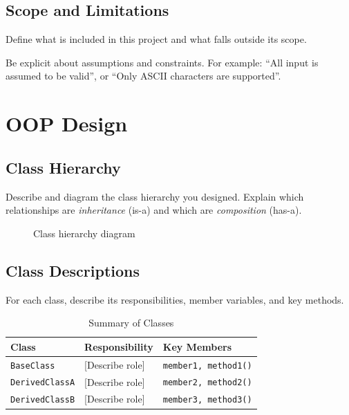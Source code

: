 \documentclass[11pt]{article}
\begin{document}
\subsection{Scope and Limitations}
Define what is included in this project and what falls outside its scope.

\begin{notebox}
Be explicit about assumptions and constraints. For example: ``All input is assumed to be valid'', or ``Only ASCII characters are supported''.
\end{notebox}

\section{OOP Design}

\subsection{Class Hierarchy}
Describe and diagram the class hierarchy you designed. Explain which relationships are \emph{inheritance} (is-a) and which are \emph{composition} (has-a).

\begin{figure}[H]
    \centering
    \caption{Class hierarchy diagram}
    \label{fig:hierarchy}
\end{figure}

\subsection{Class Descriptions}
For each class, describe its responsibilities, member variables, and key methods.

\begin{table}[H]
    \centering
    \caption{Summary of Classes}
    \label{tab:classes}
    \begin{tabular}{|l|p{4cm}|p{5cm}|}
        \hline
        \textbf{Class} & \textbf{Responsibility} & \textbf{Key Members} \\
        \hline
        \texttt{BaseClass}    & [Describe role] & \texttt{member1, method1()} \\
        \hline
        \texttt{DerivedClassA} & [Describe role] & \texttt{member2, method2()} \\
        \hline
        \texttt{DerivedClassB} & [Describe role] & \texttt{member3, method3()} \\
        \hline
    \end{tabular}
\end{table}
\end{document}
